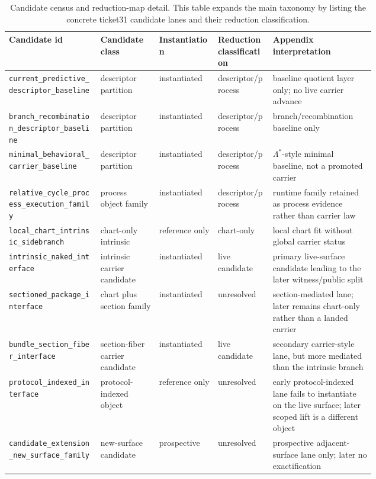 \documentclass[11pt]{article}
\theoremstyle{definition}
\begin{document}
\begin{table}[p]
\centering
\scriptsize
\caption{Candidate census and reduction-map detail. This table expands the main taxonomy by
listing the concrete ticket31 candidate lanes and their reduction classification.}
\label{tab:appendix-candidate-reduction-detail}
\begin{tabularx}{\linewidth}{@{}>{\raggedright\arraybackslash}p{0.25\linewidth}>{\raggedright\arraybackslash}p{0.16\linewidth}>{\raggedright\arraybackslash}p{0.16\linewidth}>{\raggedright\arraybackslash}p{0.15\linewidth}>{\raggedright\arraybackslash}X@{}}
\toprule
Candidate id & Candidate class & Instantiation & Reduction classification & Appendix interpretation \\
\midrule
\nolinkurl{current_predictive_descriptor_baseline} & descriptor partition & instantiated & descriptor/process & baseline quotient layer only; no live carrier advance \\
\nolinkurl{branch_recombination_descriptor_baseline} & descriptor partition & instantiated & descriptor/process & branch/recombination baseline only \\
\nolinkurl{minimal_behavioral_carrier_baseline} & descriptor partition & instantiated & descriptor/process & \(\Lambda^\ast\)-style minimal baseline, not a promoted carrier \\
\nolinkurl{relative_cycle_process_execution_family} & process object family & instantiated & descriptor/process & runtime family retained as process evidence rather than carrier law \\
\nolinkurl{local_chart_intrinsic_sidebranch} & chart-only intrinsic & reference only & chart-only & local chart fit without global carrier status \\
\nolinkurl{intrinsic_naked_interface} & intrinsic carrier candidate & instantiated & live candidate & primary live-surface candidate leading to the later witness/public split \\
\nolinkurl{sectioned_package_interface} & chart plus section family & instantiated & unresolved & section-mediated lane; later remains chart-only rather than a landed carrier \\
\nolinkurl{bundle_section_fiber_interface} & section-fiber carrier candidate & instantiated & live candidate & secondary carrier-style lane, but more mediated than the intrinsic branch \\
\nolinkurl{protocol_indexed_interface} & protocol-indexed object & reference only & unresolved & early protocol-indexed lane fails to instantiate on the live surface; later scoped lift is a different object \\
\nolinkurl{candidate_extension_new_surface_family} & new-surface candidate & prospective & unresolved & prospective adjacent-surface lane only; later no exactification \\
\bottomrule
\end{tabularx}
\end{table}
\end{document}
